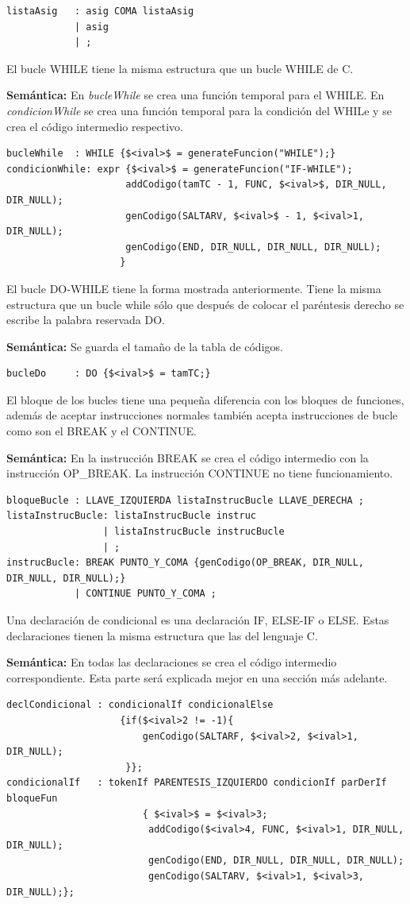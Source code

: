 \documentclass[a4paper,12pt]{article}
\begin{document}
\begin{enumerate}
\begin{enumerate}
\begin{itemize}
\begin{lstlisting}
listaAsig 	: asig COMA listaAsig
			| asig
			| ;
    \end{lstlisting}
    El bucle WHILE tiene la misma estructura que un bucle WHILE de C.
    
    \textbf{Semántica:} En \textit{bucleWhile} se crea una función temporal para el WHILE.
    En \textit{condicionWhile} se crea una función temporal para la condición del WHILe y se crea el código intermedio respectivo.
    \begin{lstlisting}
bucleWhile	: WHILE {$<ival>$ = generateFuncion("WHILE");}
condicionWhile: expr {$<ival>$ = generateFuncion("IF-WHILE");
					 addCodigo(tamTC - 1, FUNC, $<ival>$, DIR_NULL, DIR_NULL);
					 genCodigo(SALTARV, $<ival>$ - 1, $<ival>1, DIR_NULL);
					 genCodigo(END, DIR_NULL, DIR_NULL, DIR_NULL);
					}
    \end{lstlisting}
    El bucle DO-WHILE tiene la forma mostrada anteriormente. Tiene la misma estructura que un bucle while sólo que después de colocar el paréntesis derecho
    se escribe la palabra reservada DO.
    
    \textbf{Semántica:} Se guarda el tamaño de la tabla de códigos.
    \begin{lstlisting}
bucleDo		: DO {$<ival>$ = tamTC;}     
    \end{lstlisting}
    El bloque de los bucles tiene una pequeña diferencia con los bloques de funciones, además de aceptar instrucciones normales también acepta instrucciones de bucle como
    son el BREAK y el CONTINUE.
    
    \textbf{Semántica:} En la instrucción BREAK se crea el código intermedio con la instrucción OP\_BREAK. La instrucción CONTINUE no tiene funcionamiento.
    \begin{lstlisting}
bloqueBucle : LLAVE_IZQUIERDA listaInstrucBucle LLAVE_DERECHA ;
listaInstrucBucle: listaInstrucBucle instruc
				 | listaInstrucBucle instrucBucle
				 | ;
instrucBucle: BREAK PUNTO_Y_COMA {genCodigo(OP_BREAK, DIR_NULL, DIR_NULL, DIR_NULL);}
			| CONTINUE PUNTO_Y_COMA ;

    \end{lstlisting}
    Una declaración de condicional es una declaración IF, ELSE-IF o ELSE. Estas declaraciones tienen la misma estructura que las del lenguaje C.
    
    \textbf{Semántica:} En todas las declaraciones se crea el código intermedio correspondiente. Esta parte será explicada mejor en una sección más adelante.
    \begin{lstlisting}
declCondicional : condicionalIf condicionalElse
					{if($<ival>2 != -1){
					 	genCodigo(SALTARF, $<ival>2, $<ival>1, DIR_NULL);
					 }};
condicionalIf	: tokenIf PARENTESIS_IZQUIERDO condicionIf parDerIf bloqueFun
						{ $<ival>$ = $<ival>3;
						 addCodigo($<ival>4, FUNC, $<ival>1, DIR_NULL, DIR_NULL);
						 genCodigo(END, DIR_NULL, DIR_NULL, DIR_NULL);
						 genCodigo(SALTARV, $<ival>1, $<ival>3, DIR_NULL);};						


\end{lstlisting}
\end{itemize}
\end{enumerate}
\end{enumerate}
\end{document}
